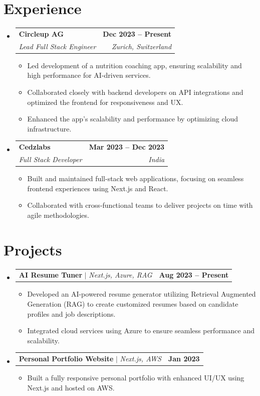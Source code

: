 \documentclass[letterpaper,11pt]{article}
\makeatletter
\newcommand{\resumeSubheading}[4]{
  \vspace{-2pt}\item
    \begin{tabular*}{1.0\textwidth}[t]{l@{\extracolsep{\fill}}r}
      \textbf{#1} & \textbf{\small #2} \\
      \textit{\small#3} & \textit{\small #4} \\
    \end{tabular*}\vspace{-7pt}
}
\newcommand{\resumeProjectHeading}[2]{
    \item
    \begin{tabular*}{1.001\textwidth}{l@{\extracolsep{\fill}}r}
      \small#1 & \textbf{\small #2}\\
    \end{tabular*}\vspace{-7pt}
}
\newcommand{\resumeSubHeadingListStart}{\begin{itemize}[leftmargin=0.0in, label={}]}
\newcommand{\resumeSubHeadingListEnd}{\end{itemize}}
\makeatother
\begin{document}
\section{Experience}
\resumeSubHeadingListStart
\resumeSubheading
{Circleup AG}{Dec 2023 -- Present}
{Lead Full Stack Engineer}{Zurich, Switzerland}
\vspace{-10pt}
\begin{itemize}
\item Led development of a nutrition coaching app, ensuring scalability and high performance for AI-driven services.
\item Collaborated closely with backend developers on API integrations and optimized the frontend for responsiveness and UX.
\item Enhanced the app's scalability and performance by optimizing cloud infrastructure.
\end{itemize}

\resumeSubheading
{Cedzlabs}{Mar 2023 -- Dec 2023}
{Full Stack Developer}{India}
\vspace{-10pt}
\begin{itemize}
\item Built and maintained full-stack web applications, focusing on seamless frontend experiences using Next.js and React.
\item Collaborated with cross-functional teams to deliver projects on time with agile methodologies.
\end{itemize}
\resumeSubHeadingListEnd

\section{Projects}
\resumeSubHeadingListStart
\resumeProjectHeading
{\textbf{AI Resume Tuner} $|$ \emph{Next.js, Azure, RAG}}{Aug 2023 -- Present}
\begin{itemize}
\item Developed an AI-powered resume generator utilizing Retrieval Augmented Generation (RAG) to create customized resumes based on candidate profiles and job descriptions.
\item Integrated cloud services using Azure to ensure seamless performance and scalability.
\end{itemize}

\resumeProjectHeading
{\textbf{Personal Portfolio Website} $|$ \emph{Next.js, AWS}}{Jan 2023}
\begin{itemize}
\item Built a fully responsive personal portfolio with enhanced UI/UX using Next.js and hosted on AWS.
\end{itemize}
\resumeSubHeadingListEnd
\end{document}
